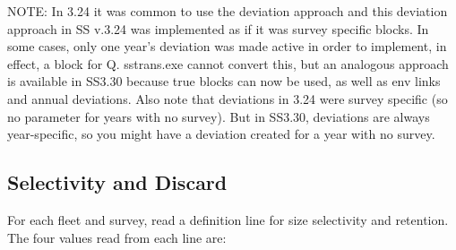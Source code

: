 \noindent NOTE:  In 3.24 it was common to use the deviation approach and this deviation approach in SS v.3.24 was implemented as if it was survey specific blocks.  In some cases, only one year's deviation was made active in order to implement, in effect, a block for Q.  sstrans.exe cannot convert this, but an analogous approach is available in SS3.30 because true blocks can now be used, as well as env links and annual deviations.  Also note that deviations in 3.24 were survey specific (so no parameter for years with no survey).  But in SS3.30, deviations are always year-specific, so you might have a deviation created for a year with no survey.\\

\subsection{Selectivity and Discard}
For each fleet and survey, read a definition line for size selectivity and retention.  The four values read from each line are:

